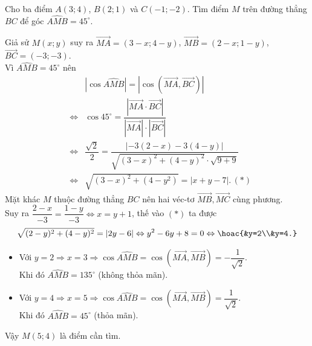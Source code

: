 \begin{bt}%
	Cho ba điểm $A(3;4)$, $B(2;1)$ và $C(-1;-2)$. Tìm điểm $M$ trên đường thẳng $BC$ để góc $\widehat{AMB}=45^\circ$.
	\loigiai
	{
		Giả sử $M(x;y)$ suy ra $\overrightarrow{MA}=(3-x;4-y)$, $\overrightarrow{MB}=(2-x;1-y)$, $\overrightarrow{BC}=(-3;-3)$.\\
		Vì $\widehat{AMB}=45^\circ$ nên
		\begin{eqnarray*}
			&&|\cos\widehat{AMB}|=|\cos(\overrightarrow{MA},\overrightarrow{BC})|\\
			&\Leftrightarrow&\cos45^\circ=\dfrac{|\overrightarrow{MA}\cdot \overrightarrow{BC}|}{|\overrightarrow{MA}|\cdot|\overrightarrow{BC}|}\\
			&\Leftrightarrow&\dfrac{\sqrt{2}}{2}=\dfrac{|-3(2-x)-3(4-y)|}{\sqrt{(3-x)^2+(4-y)^2}\cdot \sqrt{9+9}}\\
			&\Leftrightarrow&\sqrt{(3-x)^2+(4-y^2)}=|x+y-7|.\, (*)
		\end{eqnarray*}
		Mặt khác $M$ thuộc đường thẳng $BC$ nên hai véc-tơ $\overrightarrow{MB}, \overrightarrow{MC}$ cùng phương.\\
		Suy ra $\dfrac{2-x}{-3}=\dfrac{1-y}{-3}\Leftrightarrow x=y+1$, thế vào $(*)$ ta được 
		$$\sqrt{(2-y)^2+(4-y)^2}=|2y-6|\Leftrightarrow y^2-6y+8=0\Leftrightarrow \hoac{&y=2\\&y=4.}$$
		\begin{itemize}
			\item Với $y=2\Rightarrow x=3\Rightarrow \cos\widehat{AMB}=\cos(\overrightarrow{MA},\overrightarrow{MB})=-\dfrac{1}{\sqrt{2}}$.\\
			Khi đó $\widehat{AMB}=135^\circ$ (không thỏa mãn).
			\item Với $y=4\Rightarrow x=5\Rightarrow \cos\widehat{AMB}=\cos(\overrightarrow{MA},\overrightarrow{MB})=\dfrac{1}{\sqrt{2}}$.\\
			Khi đó $\widehat{AMB}=45^\circ$ (thỏa mãn).
		\end{itemize}
		Vậy $M(5;4)$ là điểm cần tìm.
	}
\end{bt}


